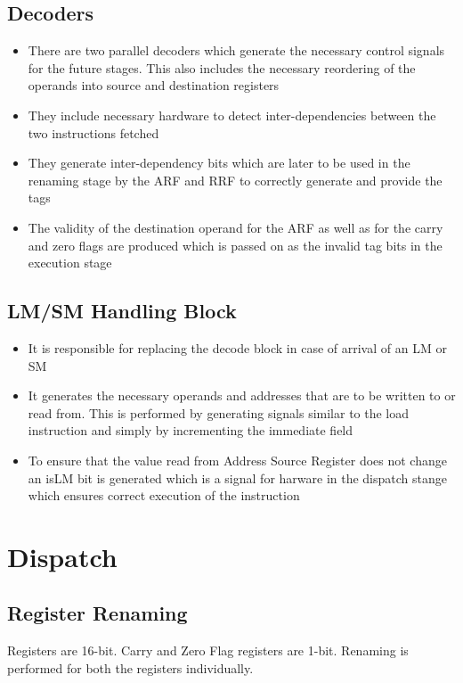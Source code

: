 \documentclass{article}
\begin{document}
\subsection{Decoders}
\begin{itemize}
\item There are two parallel decoders which generate the necessary control signals for the future stages. This also includes the necessary reordering of the operands into source and destination registers
\item They include necessary hardware to detect inter-dependencies between the two instructions fetched
\item They generate inter-dependency bits which are later to be used in the renaming stage by the ARF and RRF to correctly generate and provide the tags
\item The validity of the destination operand for the ARF as well as for the carry and zero flags are produced which is passed on as the invalid tag bits in the execution stage
\end{itemize}
\subsection{LM/SM Handling Block}
\begin{itemize}
\item It is responsible for replacing the decode block in case of arrival of an LM or SM
\item It generates the necessary operands and addresses that are to be written to or read from. This is performed by generating signals similar to the load instruction and simply by incrementing the immediate field
\item To ensure that the value read from Address Source Register does not change an isLM bit is generated which is a signal for harware in the dispatch stange which ensures correct execution of the instruction
\end{itemize}

\section{Dispatch}
\subsection{Register Renaming}
Registers are 16-bit.
Carry and Zero Flag registers are 1-bit.
Renaming is performed for both the registers individually.
\end{document}

